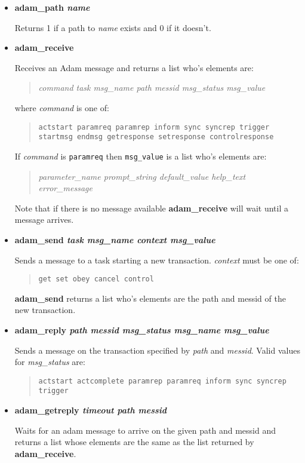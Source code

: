 \documentclass[twoside,11pt,nolof]{starlink}
\newenvironment{tquote}{\begin{quote}\raggedright}{\end{quote}}
\begin{document}
\begin{itemize}

\item \textbf{adam\_path \em name}

Returns 1 if a path to \emph{name} exists and 0 if it doesn't.

\item \textbf{adam\_receive }

Receives an Adam message and returns a list who's
elements are:
\begin{quote}\emph{command task msg\_name path messid msg\_status msg\_value
}\end{quote}
where \emph{command} is one of:
\begin{tquote}\texttt{actstart paramreq paramrep inform sync syncrep trigger startmsg
endmsg getresponse setresponse controlresponse
}\end{tquote}
If \emph{command} is \texttt{paramreq} then \texttt{msg\_value} is a list who's
elements are:
\begin{quote}\emph{parameter\_name prompt\_string default\_value help\_text error\_message
}\end{quote}
Note that if there is no message available \textbf{adam\_receive} will wait
until a message arrives.

\item \textbf{adam\_send \emph{task msg\_name context msg\_value} }

Sends a message to a task starting a new transaction. \emph{context}
must be one of:

\begin{tquote}\texttt{get set obey cancel control
}\end{tquote}
\textbf{adam\_send} returns a list who's elements are the path and messid of
the new transaction.

\item \textbf{adam\_reply \emph{path messid msg\_status msg\_name msg\_value}}

Sends a message on the transaction specified by \emph{path} and
{\em{messid}}.  Valid values for \emph{msg\_status} are:

\begin{tquote}\texttt{actstart actcomplete paramrep paramreq inform sync syncrep trigger
}\end{tquote}

\item \textbf{adam\_getreply \emph{timeout path messid}}

Waits for an adam message to arrive on the given path and messid and
returns a list whose elements are the same as the list returned by \textbf{adam\_receive}.

\end{itemize}
\end{document}
